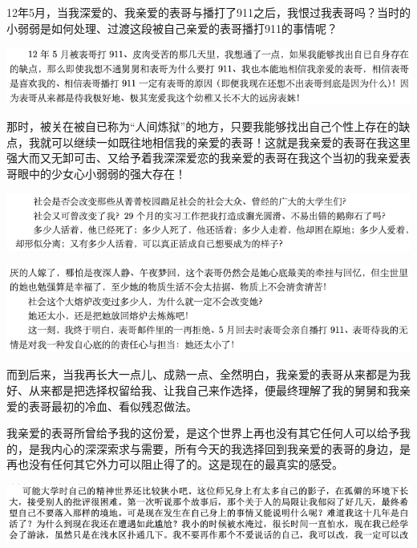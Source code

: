 \documentclass[9pt, b5paper]{article}
\begin{document}
12年5月，当我深爱的、我亲爱的表哥与播打了911之后，我恨过我表哥吗？当时的小弱弱是如何处理、过渡这段被自己亲爱的表哥播打911的事情呢？

\begin{center}
\includegraphics[width=.9\linewidth]{./pic/backups_plans_20210512_101333.png}
\end{center}

那时，被关在被自已称为“人间炼狱”的地方，只要我能够找出自己个性上存在的缺点，我就可以继续一如既往地相信我的亲爱的表哥！这就是我亲爱的表哥在我这里强大而又无卸可击、又给予着我深深爱恋的我亲爱的表哥在我这个当初的我亲爱表哥眼中的少女心小弱弱的强大存在！

\begin{center}
\includegraphics[width=.9\linewidth]{./pic/backups_plans_20210512_102518.png}
\end{center}

\begin{center}
\includegraphics[width=.9\linewidth]{./pic/backups_plans_20210512_102616.png}
\end{center}

而到后来，当我再长大一点儿、成熟一点、全然明白，我亲爱的表哥从来都是为我好、从来都是把选择权留给我、让我自己来作选择，便最终理解了我的舅舅和我亲爱的表哥最初的冷血、看似残忍做法。

我亲爱的表哥所曾给予我的这份爱，是这个世界上再也没有其它任何人可以给予我的，是我内心的深深索求与需要，所有今天的我选择回到我亲爱的表哥的身边，是再也没有任何其它外力可以阻止得了的。这是现在的最真实的感受。 

\begin{center}
\includegraphics[width=.9\linewidth]{./pic/backups_plans_20210512_100917.png}
\end{center}
\end{document}
